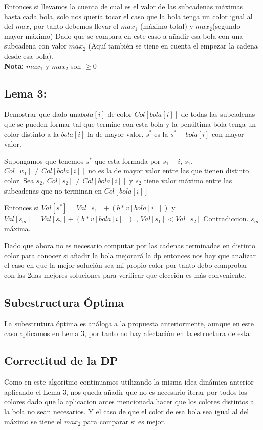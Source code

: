 \documentclass{article}
\begin{document}
Entonces si llevamos la cuenta de cual es el valor de las subcadenas máximas hasta cada bola, solo nos quería tocar el caso
que la bola tenga un color igual al del $max$, por tanto debemos llevar el $max_1$ (máximo total) y $max_2 $(segundo mayor máximo)
Dado que se compara en este caso a añadir esa bola con una subcadena con valor  $max_2 $ (Aquí también se tiene en cuenta el empezar la cadena desde esa bola).
\\
\textbf{Nota:} $max_1 $ y $max_2 $ son $\geq 0$

\subsection{Lema 3:}
Demostrar que dado una$ bola[i]$ de color $Col[bola[i]]$ de todas las subcadenas que se pueden formar tal que termine con esta bola
y la penúltima bola tenga un color distinto a la $bola[i]$  la de mayor valor, $s^*$ es la $s^*-bola[i]$ con mayor valor.

Supongamos que tenemos $s^*$ que esta formada por $s_1+i$, $s_1$, $Col[w_1] \neq Col[bola[i]]$ no es la de mayor
valor entre las que tienen distinto color. 
Sea $s_2$, $Col[s_2] \neq Col[bola[i]]$ y $s_2$ tiene valor máximo entre las subcadenas que no terminan en  $Col[bola[i]]$

Entonces si $Val[s^*]= Val[s_1]+(b*v[bola[i]])$ y $Val[s_m]= Val[s_2]+(b*v[bola[i]])$ , $Val[s_1]<Val[s_2]$ Contradiccion.
$s_m$ máxima.

Dado que ahora no es necesario computar por las cadenas terminadas en distinto color para conocer si 
añadir la bola mejorará la dp entonces nos hay que analizar el caso en que la mejor solución sea mi propio color
por tanto debo comprobar con las 2das mejores soluciones para verificar que elección es más conveniente.



\subsection{Subestructura Óptima}
La subestrutura óptima es análoga a la propuesta anteriormente, aunque en este caso aplicamos en Lema 3, por tanto
no hay afectación en la estructura de esta
\subsection{Correctitud de la DP}
Como en este algoritmo continuamos utilizando la misma idea dinámica anterior aplicando el Lema 3, nos queda añadir que 
no es necesario iterar por todos los colores dado que la aplicacion antes mencionada hacer que los colores distintos a la bola no 
sean necesarios. Y el caso de que el color de esa bola sea igual al del máximo se tiene el $max_2 $ para comparar si es mejor.
\end{document}
